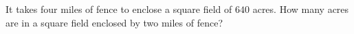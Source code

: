 It takes four miles of fence to enclose a square field of $640$ acres. How many acres are in a square field enclosed by two miles of fence?
